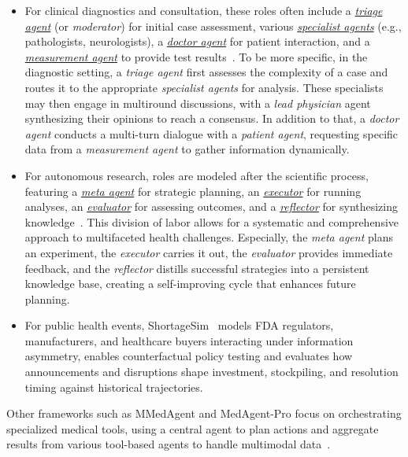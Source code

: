 \begin{itemize}
    \item For clinical diagnostics and consultation, these roles often include a \underline{\emph{triage agent}} (or \emph{moderator}) for initial case assessment, various \underline{\emph{specialist agents}} (e.g., pathologists, neurologists), a \underline{\emph{doctor agent}} for patient interaction, and a \underline{\emph{measurement agent}} to provide test results~\cite{kim2024mdagents, ghezloo2025pathfinder}. To be more specific, in the diagnostic setting, a \emph{triage agent} first assesses the complexity of a case and routes it to the appropriate \emph{specialist agents} for analysis. These specialists may then engage in multiround discussions, with a \emph{lead physician} agent synthesizing their opinions to reach a consensus. In addition to that, a \emph{doctor agent} conducts a multi-turn dialogue with a \emph{patient agent}, requesting specific data from a \emph{measurement agent} to gather information dynamically.
    \item For autonomous research, roles are modeled after the scientific process, featuring a \underline{\emph{meta agent}} for strategic planning, an \underline{\emph{executor}} for running analyses, an \underline{\emph{evaluator}} for assessing outcomes, and a \underline{\emph{reflector}} for synthesizing knowledge~\cite{zhu2025healthflow}. This division of labor allows for a systematic and comprehensive approach to multifaceted health challenges. Especially, the \emph{meta agent} plans an experiment, the \emph{executor} carries it out, the \emph{evaluator} provides immediate feedback, and the \emph{reflector} distills successful strategies into a persistent knowledge base, creating a self-improving cycle that enhances future planning.
    \item For public health events, ShortageSim~\cite{cui2025shortagesim} models FDA regulators, manufacturers, and healthcare buyers interacting under information asymmetry, enables counterfactual policy testing and evaluates how announcements and disruptions shape investment, stockpiling, and resolution timing against historical trajectories.
\end{itemize}

Other frameworks such as MMedAgent and MedAgent-Pro focus on orchestrating specialized medical tools, using a central agent to plan actions and aggregate results from various tool-based agents to handle multimodal data~\cite{li2024mmedagent, wang2025medagent}. 


